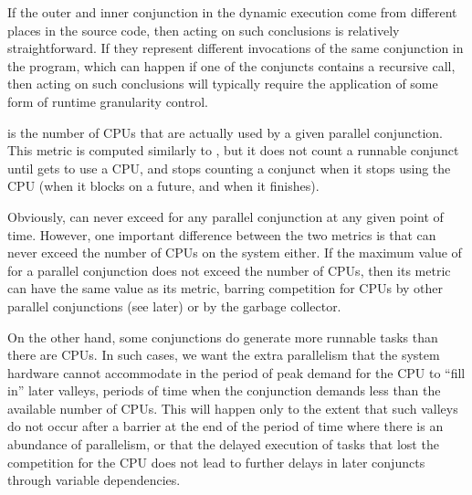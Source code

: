 If the outer and inner conjunction in the dynamic execution
come from different places in the source code,
then acting on such conclusions is relatively straightforward.
If they represent different invocations of the same conjunction in the program,
which can happen if one of the conjuncts contains a recursive call,
then acting on such conclusions will typically require
the application of some form of runtime granularity control.


is the number of CPUs that are actually used by a given parallel conjunction.
This metric is computed similarly to ,
but it does not count a runnable conjunct until gets to use a CPU,
and stops counting a conjunct when it stops using the CPU
(when it blocks on a future, and when it finishes).

Obviously,  can never exceed 
for any parallel conjunction at any given point of time.
However, one important difference between the two metrics
is that  can never exceed
the number of CPUs on the system either.
If the maximum value of  for a parallel
conjunction
does not exceed the number of CPUs,
then its  metric
can have the same value as its  metric,
barring competition for CPUs by other parallel conjunctions (see later)
or by the garbage collector.

On the other hand, some conjunctions
do generate more runnable tasks than there are CPUs.
In such cases, we want the extra parallelism
that the system hardware cannot accommodate
in the period of peak demand for the CPU
to ``fill in'' later valleys,
periods of time when the conjunction demands
less than the available number of CPUs.
This will happen only to the extent that
such valleys do not occur after a barrier at the end of the period of time
where there is an abundance of parallelism,
or that the delayed execution of tasks that lost the competition for the CPU
does not lead to further delays in later conjuncts
through variable dependencies.


